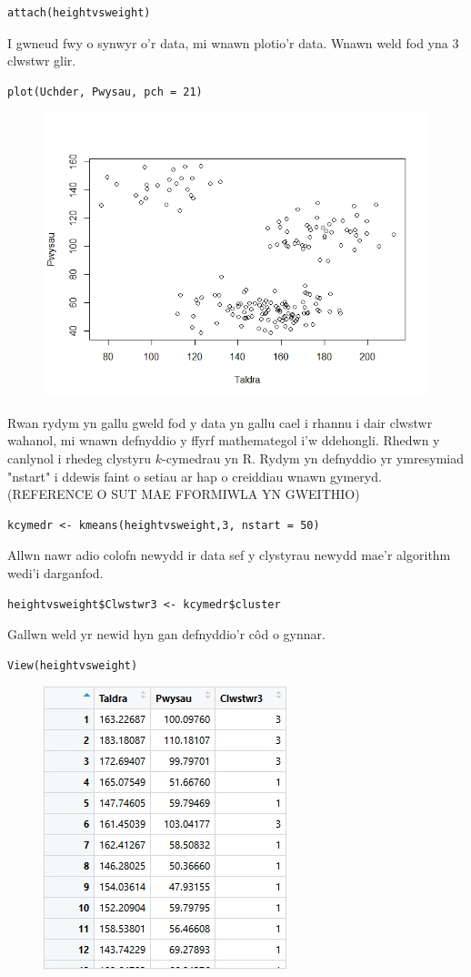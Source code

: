 \begin{verbatim}
attach(heightvsweight)
\end{verbatim}

I gwneud fwy o synwyr o'r data, mi wnawn plotio'r data. Wnawn weld fod yna 3 clwstwr glir. 

\begin{verbatim}
plot(Uchder, Pwysau, pch = 21)
\end{verbatim}

\begin{figure}[h]
\includegraphics[width=0.5\linewidth]{../img/ScatterplotR.jpeg}
\label{fig:ScatterplotR}
\end{figure}

Rwan rydym yn gallu gweld fod y data yn gallu cael i rhannu i dair clwstwr wahanol, mi wnawn defnyddio y ffyrf mathemategol i'w ddehongli. Rhedwn y canlynol i rhedeg clystyru $k$-cymedrau yn R. Rydym yn defnyddio yr ymresymiad "nstart" i ddewis faint o setiau ar hap o creiddiau wnawn gymeryd. (REFERENCE O SUT MAE FFORMIWLA YN GWEITHIO) 

\begin{verbatim}
kcymedr <- kmeans(heightvsweight,3, nstart = 50)
\end{verbatim}

Allwn nawr adio colofn newydd ir data sef y clystyrau newydd mae'r algorithm wedi'i darganfod.

\begin{verbatim}
heightvsweight$Clwstwr3 <- kcymedr$cluster
\end{verbatim}

Gallwn weld yr newid hyn gan defnyddio'r c\^{o}d o gynnar.

\begin{verbatim}
View(heightvsweight)
\end{verbatim}

\begin{figure}[h]
\includegraphics[width=0.5\linewidth]{../img/Data3_yn_R.jpg}
\end{figure}

